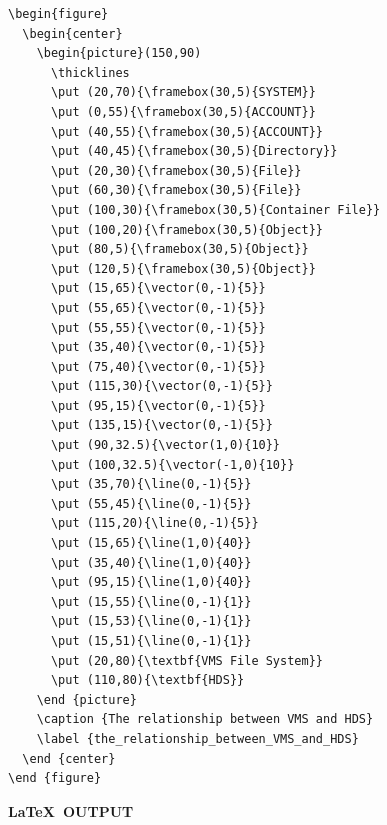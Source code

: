 \documentclass[11pt,twoside]{article}
\begin{document}
\begin{verbatim}
\begin{figure}
  \begin{center}
    \begin{picture}(150,90)
      \thicklines
      \put (20,70){\framebox(30,5){SYSTEM}}
      \put (0,55){\framebox(30,5){ACCOUNT}}
      \put (40,55){\framebox(30,5){ACCOUNT}}
      \put (40,45){\framebox(30,5){Directory}}
      \put (20,30){\framebox(30,5){File}}
      \put (60,30){\framebox(30,5){File}}
      \put (100,30){\framebox(30,5){Container File}}
      \put (100,20){\framebox(30,5){Object}}
      \put (80,5){\framebox(30,5){Object}}
      \put (120,5){\framebox(30,5){Object}}
      \put (15,65){\vector(0,-1){5}}
      \put (55,65){\vector(0,-1){5}}
      \put (55,55){\vector(0,-1){5}}
      \put (35,40){\vector(0,-1){5}}
      \put (75,40){\vector(0,-1){5}}
      \put (115,30){\vector(0,-1){5}}
      \put (95,15){\vector(0,-1){5}}
      \put (135,15){\vector(0,-1){5}}
      \put (90,32.5){\vector(1,0){10}}
      \put (100,32.5){\vector(-1,0){10}}
      \put (35,70){\line(0,-1){5}}
      \put (55,45){\line(0,-1){5}}
      \put (115,20){\line(0,-1){5}}
      \put (15,65){\line(1,0){40}}
      \put (35,40){\line(1,0){40}}
      \put (95,15){\line(1,0){40}}
      \put (15,55){\line(0,-1){1}}
      \put (15,53){\line(0,-1){1}}
      \put (15,51){\line(0,-1){1}}
      \put (20,80){\textbf{VMS File System}}
      \put (110,80){\textbf{HDS}}
    \end {picture}
    \caption {The relationship between VMS and HDS}
    \label {the_relationship_between_VMS_and_HDS}
  \end {center}
\end {figure}
\end{verbatim}

\newpage

\begin{center}
  \textbf{\LaTeX\ OUTPUT}
\end{center}
\end{document}
